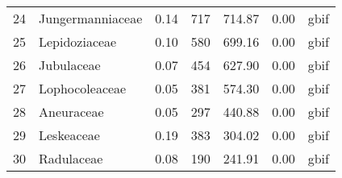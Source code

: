 \begin{table}[ht]
\begin{tabular}{rlrrrrl}
  24 & Jungermanniaceae & 0.14 & 717 & 714.87 & 0.00 & gbif \\ 
  25 & Lepidoziaceae & 0.10 & 580 & 699.16 & 0.00 & gbif \\ 
  26 & Jubulaceae & 0.07 & 454 & 627.90 & 0.00 & gbif \\ 
  27 & Lophocoleaceae & 0.05 & 381 & 574.30 & 0.00 & gbif \\ 
  28 & Aneuraceae & 0.05 & 297 & 440.88 & 0.00 & gbif \\ 
  29 & Leskeaceae & 0.19 & 383 & 304.02 & 0.00 & gbif \\ 
  30 & Radulaceae & 0.08 & 190 & 241.91 & 0.00 & gbif \\ 
   \hline
\end{tabular}
\end{table}
